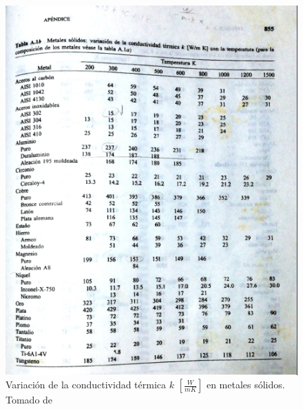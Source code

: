 \documentclass[12pt,letterpaper]{article}     %
\begin{document}
\begin{figure}[H]
\centering
\includegraphics[width=1.2\textwidth]{Imagines/Varconductermicatemperatura.png}
\caption{ Variación de la conductividad térmica $k$ $[\frac{W}{mK}]$ en metales sólidos. Tomado de \cite[p\ 855]{Mills}}
\label{fig:conducciontermica}
\end{figure}
\end{document}
